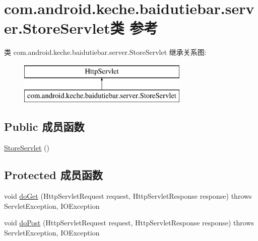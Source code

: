 \hypertarget{classcom_1_1android_1_1keche_1_1baidutiebar_1_1server_1_1_store_servlet}{}\section{com.\+android.\+keche.\+baidutiebar.\+server.\+Store\+Servlet类 参考}
\label{classcom_1_1android_1_1keche_1_1baidutiebar_1_1server_1_1_store_servlet}
类 com.\+android.\+keche.\+baidutiebar.\+server.\+Store\+Servlet 继承关系图\+:\begin{figure}[H]
\begin{center}
\leavevmode
\includegraphics[height=2.000000cm]{classcom_1_1android_1_1keche_1_1baidutiebar_1_1server_1_1_store_servlet}
\end{center}
\end{figure}
\subsection*{Public 成员函数}
\begin{DoxyCompactItemize}
\item 
\mbox{\hyperlink{classcom_1_1android_1_1keche_1_1baidutiebar_1_1server_1_1_store_servlet_a672deecf5ea8ee1662bb5b6276c2efba}{Store\+Servlet}} ()
\end{DoxyCompactItemize}
\subsection*{Protected 成员函数}
\begin{DoxyCompactItemize}
\item 
void \mbox{\hyperlink{classcom_1_1android_1_1keche_1_1baidutiebar_1_1server_1_1_store_servlet_af5561d80e47cc7f9da40d6caf7d72bea}{do\+Get}} (Http\+Servlet\+Request request, Http\+Servlet\+Response response)  throws Servlet\+Exception, I\+O\+Exception 
\item 
void \mbox{\hyperlink{classcom_1_1android_1_1keche_1_1baidutiebar_1_1server_1_1_store_servlet_a033ebdbf83e2504fa7249f1ff94df27c}{do\+Post}} (Http\+Servlet\+Request request, Http\+Servlet\+Response response)  throws Servlet\+Exception, I\+O\+Exception 
\end{DoxyCompactItemize}


